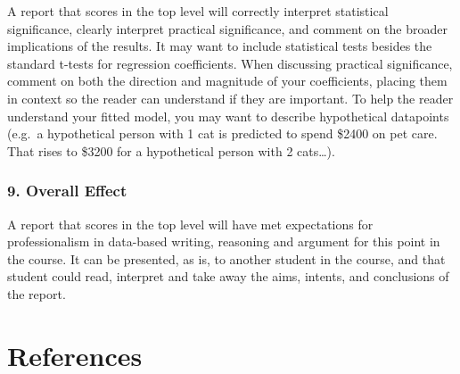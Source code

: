 \documentclass[
  letterpaper,
  DIV=11,
  numbers=noendperiod]{scrartcl}
\newlength{\cslhangindent}
\newenvironment{CSLReferences}[2] %
 {\begin{list}{}{%
  \setlength{\itemindent}{0pt}
  \setlength{\leftmargin}{0pt}
  \setlength{\parsep}{0pt}
  \ifodd #1
   \setlength{\leftmargin}{\cslhangindent}
   \setlength{\itemindent}{-1\cslhangindent}
  \fi
  \setlength{\itemsep}{#2\baselineskip}}}
 {\end{list}}
\begin{document}
A report that scores in the top level will correctly interpret
statistical significance, clearly interpret practical significance, and
comment on the broader implications of the results. It may want to
include statistical tests besides the standard t-tests for regression
coefficients. When discussing practical significance, comment on both
the direction and magnitude of your coefficients, placing them in
context so the reader can understand if they are important. To help the
reader understand your fitted model, you may want to describe
hypothetical datapoints (e.g.~a hypothetical person with 1 cat is
predicted to spend \$2400 on pet care. That rises to \$3200 for a
hypothetical person with 2 cats\ldots).

\subsubsection{9. Overall Effect}\label{overall-effect}

A report that scores in the top level will have met expectations for
professionalism in data-based writing, reasoning and argument for this
point in the course. It can be presented, as is, to another student in
the course, and that student could read, interpret and take away the
aims, intents, and conclusions of the report.

\section{References}\label{references}

\label{refs}
\begin{CSLReferences}{0}{1}
\end{CSLReferences}
\end{document}
